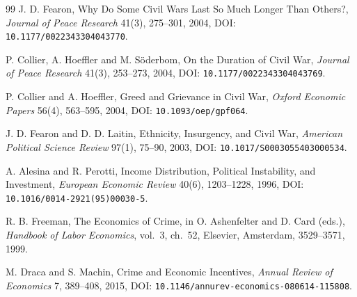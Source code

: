 \documentclass[12pt]{article}
\theoremstyle{plain}
\begin{document}
\begin{thebibliography}{99}
 J. D. Fearon, Why Do Some Civil Wars Last So Much Longer Than Others?, \emph{Journal of Peace Research} 41(3), 275--301, 2004, DOI: \texttt{10.1177/0022343304043770}.

 P. Collier, A. Hoeffler and M. S\"oderbom, On the Duration of Civil War, \emph{Journal of Peace Research} 41(3), 253--273, 2004, DOI: \texttt{10.1177/0022343304043769}.

 P. Collier and A. Hoeffler, Greed and Grievance in Civil War, \emph{Oxford Economic Papers} 56(4), 563--595, 2004, DOI: \texttt{10.1093/oep/gpf064}.

 J. D. Fearon and D. D. Laitin, Ethnicity, Insurgency, and Civil War, \emph{American Political Science Review} 97(1), 75--90, 2003, DOI: \texttt{10.1017/S0003055403000534}.

 A. Alesina and R. Perotti, Income Distribution, Political Instability, and Investment, \emph{European Economic Review} 40(6), 1203--1228, 1996, DOI: \texttt{10.1016/0014-2921(95)00030-5}.

 R. B. Freeman, The Economics of Crime, in O. Ashenfelter and D. Card (eds.), \emph{Handbook of Labor Economics}, vol.~3, ch.~52, Elsevier, Amsterdam, 3529--3571, 1999.

 M. Draca and S. Machin, Crime and Economic Incentives, \emph{Annual Review of Economics} 7, 389--408, 2015, DOI: \texttt{10.1146/annurev-economics-080614-115808}.

\end{thebibliography}
\end{document}
